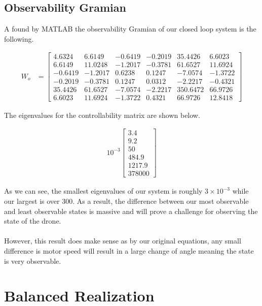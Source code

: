 \documentclass{article}
\begin{document}
    \subsection{Observability Gramian}\label{subsec:observability_gramian}

    A found by MATLAB the observability Gramian of our closed loop system is the following.

    \begin{align}
        W_o &= \begin{bmatrix} 4.6324 & 6.6149 & -0.6419 & -0.2019 & 35.4426 & 6.6023 \\ 6.6149 & 11.0248 & -1.2017 & -0.3781 & 61.6527 & 11.6924 \\
            -0.6419 & -1.2017 & 0.6238 & 0.1247 & -7.0574 & -1.3722 \\ -0.2019 & -0.3781 & 0.1247 & 0.0312 & -2.2217 & -0.4321 \\
            35.4426 & 61.6527 & -7.0574 & -2.2217 & 350.6472 & 66.9726 \\
            6.6023 & 11.6924 & -1.3722 & 0.4321 & 66.9726 & 12.8418
        \end{bmatrix}
    \end{align}

    The eigenvalues for the controllability matrix are shown below.

    \begin{align}
        10^{-3} \begin{bmatrix} 3.4 \\ 9.2 \\ 50 \\ 484.9 \\ 1217.9 \\ 378000 \end{bmatrix}
    \end{align}

    As we can see, the smallest eigenvalues of our system is roughly $3 \times 10^{-3}$ while our largest
    is over 300.
    As a result, the difference between our most observable and least observable states is massive and will prove a challenge for observing the state of the drone.\\
    \\
    However, this result does make sense as by our original equations, any small difference is motor speed will result in a large change of angle
    meaning the state is very observable.

    \section{Balanced Realization}\label{sec:balanced_realization}
\end{document}
